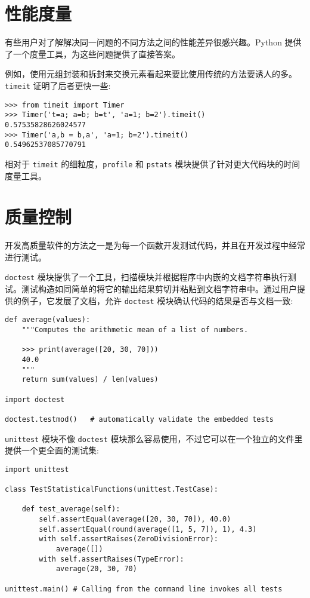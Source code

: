 \section{性能度量}
有些用户对了解解决同一问题的不同方法之间的性能差异很感兴趣。Python 提供了一个度量工具，为这些问题提供了直接答案。

例如，使用元组封装和拆封来交换元素看起来要比使用传统的方法要诱人的多。\texttt{timeit} 证明了后者更快一些:
\begin{lstlisting}
>>> from timeit import Timer
>>> Timer('t=a; a=b; b=t', 'a=1; b=2').timeit()
0.57535828626024577
>>> Timer('a,b = b,a', 'a=1; b=2').timeit()
0.54962537085770791
\end{lstlisting}
相对于 \texttt{timeit} 的细粒度，\texttt{profile} 和 \texttt{pstats} 模块提供了针对更大代码块的时间度量工具。
\section{质量控制}
开发高质量软件的方法之一是为每一个函数开发测试代码，并且在开发过程中经常进行测试。

\texttt{doctest} 模块提供了一个工具，扫描模块并根据程序中内嵌的文档字符串执行测试。测试构造如同简单的将它的输出结果剪切并粘贴到文档字符串中。通过用户提供的例子，它发展了文档，允许 \texttt{doctest} 模块确认代码的结果是否与文档一致:
\begin{lstlisting}
def average(values):
    """Computes the arithmetic mean of a list of numbers.

    >>> print(average([20, 30, 70]))
    40.0
    """
    return sum(values) / len(values)

import doctest

doctest.testmod()   # automatically validate the embedded tests
\end{lstlisting}
\texttt{unittest} 模块不像 \texttt{doctest} 模块那么容易使用，不过它可以在一个独立的文件里提供一个更全面的测试集:
\begin{lstlisting}
import unittest

class TestStatisticalFunctions(unittest.TestCase):

    def test_average(self):
        self.assertEqual(average([20, 30, 70]), 40.0)
        self.assertEqual(round(average([1, 5, 7]), 1), 4.3)
        with self.assertRaises(ZeroDivisionError):
            average([])
        with self.assertRaises(TypeError):
            average(20, 30, 70)

unittest.main() # Calling from the command line invokes all tests
\end{lstlisting}
